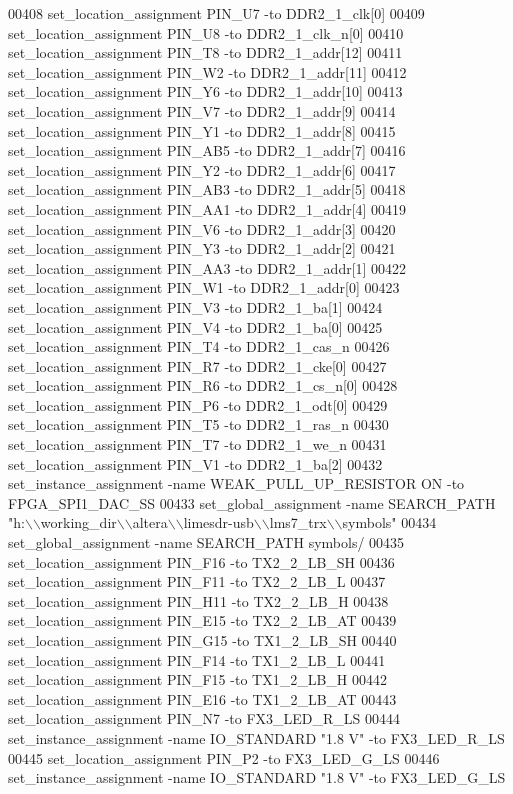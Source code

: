\begin{DoxyCode}
00408 set\_location\_assignment PIN\_U7 -to DDR2\_1\_clk[0]
00409 set\_location\_assignment PIN\_U8 -to DDR2\_1\_clk\_n[0]
00410 set\_location\_assignment PIN\_T8 -to DDR2\_1\_addr[12]
00411 set\_location\_assignment PIN\_W2 -to DDR2\_1\_addr[11]
00412 set\_location\_assignment PIN\_Y6 -to DDR2\_1\_addr[10]
00413 set\_location\_assignment PIN\_V7 -to DDR2\_1\_addr[9]
00414 set\_location\_assignment PIN\_Y1 -to DDR2\_1\_addr[8]
00415 set\_location\_assignment PIN\_AB5 -to DDR2\_1\_addr[7]
00416 set\_location\_assignment PIN\_Y2 -to DDR2\_1\_addr[6]
00417 set\_location\_assignment PIN\_AB3 -to DDR2\_1\_addr[5]
00418 set\_location\_assignment PIN\_AA1 -to DDR2\_1\_addr[4]
00419 set\_location\_assignment PIN\_V6 -to DDR2\_1\_addr[3]
00420 set\_location\_assignment PIN\_Y3 -to DDR2\_1\_addr[2]
00421 set\_location\_assignment PIN\_AA3 -to DDR2\_1\_addr[1]
00422 set\_location\_assignment PIN\_W1 -to DDR2\_1\_addr[0]
00423 set\_location\_assignment PIN\_V3 -to DDR2\_1\_ba[1]
00424 set\_location\_assignment PIN\_V4 -to DDR2\_1\_ba[0]
00425 set\_location\_assignment PIN\_T4 -to DDR2\_1\_cas\_n
00426 set\_location\_assignment PIN\_R7 -to DDR2\_1\_cke[0]
00427 set\_location\_assignment PIN\_R6 -to DDR2\_1\_cs\_n[0]
00428 set\_location\_assignment PIN\_P6 -to DDR2\_1\_odt[0]
00429 set\_location\_assignment PIN\_T5 -to DDR2\_1\_ras\_n
00430 set\_location\_assignment PIN\_T7 -to DDR2\_1\_we\_n
00431 set\_location\_assignment PIN\_V1 -to DDR2\_1\_ba[2]
00432 set\_instance\_assignment -name WEAK\_PULL\_UP\_RESISTOR \textcolor{keywordflow}{ON} -to FPGA\_SPI1\_DAC\_SS
00433 set\_global\_assignment -name SEARCH\_PATH "h:\(\backslash\)\(\backslash\)working\_dir\(\backslash\)\(\backslash\)altera\(\backslash\)\(\backslash\)limesdr-usb\(\backslash\)\(\backslash\)lms7\_trx\(\backslash\)\(\backslash\)symbols"
00434 set\_global\_assignment -name SEARCH\_PATH symbols/
00435 set\_location\_assignment PIN\_F16 -to TX2\_2\_LB\_SH
00436 set\_location\_assignment PIN\_F11 -to TX2\_2\_LB\_L
00437 set\_location\_assignment PIN\_H11 -to TX2\_2\_LB\_H
00438 set\_location\_assignment PIN\_E15 -to TX2\_2\_LB\_AT
00439 set\_location\_assignment PIN\_G15 -to TX1\_2\_LB\_SH
00440 set\_location\_assignment PIN\_F14 -to TX1\_2\_LB\_L
00441 set\_location\_assignment PIN\_F15 -to TX1\_2\_LB\_H
00442 set\_location\_assignment PIN\_E16 -to TX1\_2\_LB\_AT
00443 set\_location\_assignment PIN\_N7 -to FX3\_LED\_R\_LS
00444 set\_instance\_assignment -name IO\_STANDARD "1.\textcolor{vhdllogic}{8} V" -to FX3\_LED\_R\_LS
00445 set\_location\_assignment PIN\_P2 -to FX3\_LED\_G\_LS
00446 set\_instance\_assignment -name IO\_STANDARD "1.\textcolor{vhdllogic}{8} V" -to FX3\_LED\_G\_LS

\end{DoxyCode}
